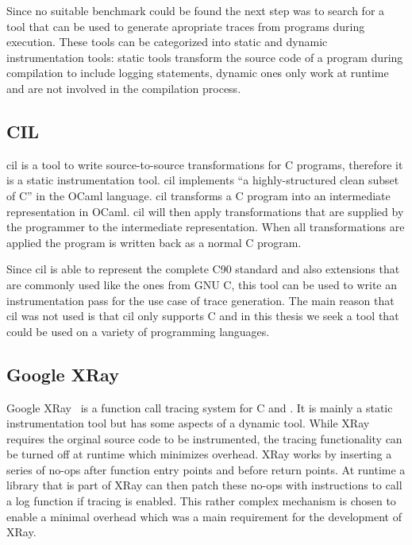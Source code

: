 Since no suitable benchmark could be found the next step was to search for a tool that can be used to generate apropriate traces from programs during execution.
These tools can be categorized into static and dynamic instrumentation tools: static tools transform the source code of a program during compilation to include logging statements, dynamic ones only work at runtime and are not involved in the compilation process.

\subsection{CIL}

\Gls{cil} \cite{Necula2002} is a tool to write source-to-source transformations for C programs, therefore it is a static instrumentation tool.
\Gls{cil} implements ``a highly-structured clean subset of C'' in the OCaml language.
\Gls{cil} transforms a C program into an intermediate representation in OCaml.
\Gls{cil} will then apply transformations that are supplied by the programmer to the intermediate representation.
When all transformations are applied the program is written back as a normal C program.

Since \gls{cil} is able to represent the complete C90 standard and also extensions that are commonly used like the ones from GNU C, this tool can be used to write an instrumentation pass for the use case of trace generation.
The main reason that \gls{cil} was not used is that \gls{cil} only supports C and in this thesis we seek a tool that could be used on a variety of programming languages.

\subsection{Google XRay}

Google XRay~\cite{Berris2016} is a function call tracing system for C and \CC.
It is mainly a static instrumentation tool but has some aspects of a dynamic tool.
While XRay requires the orginal source code to be instrumented, the tracing functionality can be turned off at runtime which minimizes overhead.
XRay works by inserting a series of no-ops after function entry points and before return points.
At runtime a library that is part of XRay can then patch these no-ops with instructions to call a log function if tracing is enabled.
This rather complex mechanism is chosen to enable a minimal overhead which was a main requirement for the development of XRay.

